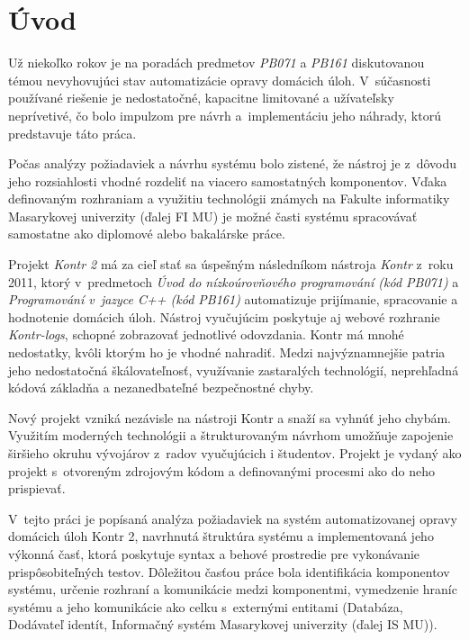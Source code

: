 \documentclass[
  digital, %
  oneside, %
  table,   %
  lof,     %
  lot,   %
]{fithesis3}
\begin{document}
\chapter*{Úvod}

Už niekoľko rokov je na poradách predmetov \textit{PB071} a \textit{PB161} diskutovanou témou nevyhovujúci stav automatizácie opravy domácich úloh. V~súčasnosti používané riešenie je nedostatočné, kapacitne limitované a užívateľsky neprívetivé, čo bolo impulzom pre návrh a~implementáciu jeho náhrady, ktorú predstavuje táto práca.

Počas analýzy požiadaviek a návrhu systému bolo zistené, že nástroj je z~dôvodu jeho rozsiahlosti vhodné rozdeliť na viacero samostatných komponentov. Vďaka definovaným rozhraniam a využitiu technológii známych na Fakulte informatiky Masarykovej univerzity (ďalej FI MU) je možné časti systému spracovávať samostatne ako diplomové alebo bakalárske práce.

Projekt \textit{Kontr 2} má za cieľ stať sa úspešným následníkom nástroja \textit{Kontr}\cite{kontr} z~roku 2011, ktorý v~predmetoch \emph{Úvod do nízkoúrovňového programování (kód PB071)} a \emph{Programování v~jazyce C++ (kód PB161)} automatizuje prijímanie, spracovanie a hodnotenie domácich úloh. Nástroj vyučujúcim poskytuje aj webové rozhranie \textit{Kontr-logs}\cite{KontrWeb}, schopné zobrazovať jednotlivé odovzdania. Kontr má mnohé nedostatky, kvôli ktorým ho je vhodné nahradiť. Medzi najvýznamnejšie patria jeho nedostatočná škálovateľnosť, využívanie zastaralých technológií, neprehľadná kódová základňa a nezanedbateľné bezpečnostné chyby.

Nový projekt vzniká nezávisle na nástroji Kontr a snaží sa vyhnúť jeho chybám. Využitím moderných technológii a štrukturovaným návrhom umožňuje zapojenie širšieho okruhu vývojárov z~radov vyučujúcich i študentov. Projekt je vydaný ako projekt s~otvoreným zdrojovým kódom a definovanými procesmi ako do neho prispievať.

V~tejto práci je popísaná analýza požiadaviek na systém automatizovanej opravy domácich úloh Kontr 2, navrhnutá štruktúra systému a implementovaná jeho výkonná časť, ktorá poskytuje syntax a behové prostredie pre vykonávanie prispôsobiteľných testov. Dôležitou časťou práce bola identifikácia komponentov systému, určenie rozhraní a komunikácie medzi komponentmi, vymedzenie hraníc systému a jeho komunikácie ako celku s~externými entitami (Databáza, Dodávateľ identít, Informačný systém Masarykovej univerzity (ďalej IS MU)).
\end{document}

